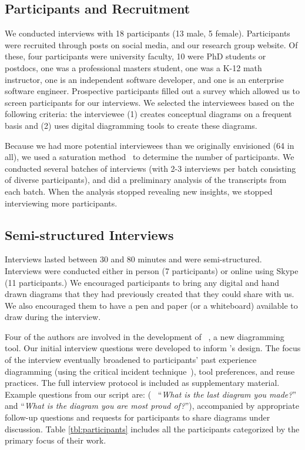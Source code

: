 \subsection{Participants and Recruitment} 
We conducted interviews with 18 participants (13 male, 5 female). Participants were recruited through posts on social media, and our research group website. Of these, four participants were university faculty, 10 were PhD students or postdocs, one was a professional masters student, one was a K-12 math instructor, one is an independent software developer, and one is an enterprise software engineer. Prospective participants filled out a survey which allowed us to screen participants for our interviews. We selected the interviewees based on the following criteria: the interviewee (1) creates conceptual diagrams on a frequent basis and (2) uses digital diagramming tools to create these diagrams. 

Because we had more potential interviewees than we originally envisioned (64 in all), we used a saturation method~\cite{socialResearchMethods} to determine the number of participants. We conducted several batches of interviews (with 2-3 interviews per batch consisting of diverse participants), and did a preliminary analysis of the transcripts from each batch. When the analysis stopped revealing new insights, we stopped interviewing more participants. 

\subsection{Semi-structured Interviews}
 
Interviews lasted between 30 and 80 minutes and were semi-structured. Interviews were conducted either in person (7 participants) or online using Skype (11 participants.) We encouraged participants to bring any digital and hand drawn diagrams that they had previously created that they could share with us. We also encouraged them to have a pen and paper (or a whiteboard) available to draw during the interview. 

Four of the authors are involved in the development of \Penrose{}~\cite{DSLDI, OBT}, a new diagramming tool. Our initial interview questions were developed to inform \Penrose{}'s design. The focus of the interview eventually broadened to participants' past experience diagramming (using the critical incident technique~\cite{criticalIncident}), tool preferences, and reuse practices. The full interview protocol is included as supplementary material. Example questions from our script are: (\eg{}~ ``\textit{What is the last diagram you made?}'' and ``\textit{What is the diagram you are most proud of?}''), accompanied by appropriate follow-up questions and requests for participants to share diagrams under discussion. Table \ref{tbl:participants} includes all the participants categorized by the primary focus of their work.

